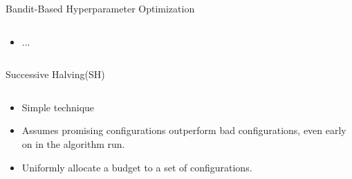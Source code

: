 \begin{frame}{Bandit-Based Hyperparameter Optimization}
\begin{columns}
\begin{column}{.45\linewidth}
\begin{itemize}
\begin{itemize}
	    \item ...
	\end{itemize}
\end{itemize}
\end{column}

\begin{column}{.45\textwidth}

\end{column}

\end{columns}

\end{frame}


\begin{frame}{Successive Halving(SH)}
\begin{columns}

\begin{column}{.45\textwidth}
\vspace{-1em}
\begin{itemize}
    \item Simple technique
    \item Assumes promising configurations outperform bad configurations, even early on in the algorithm run.
    \pause
    \item Uniformly allocate a budget to a set of configurations.
    \pause
\end{itemize}
\end{column}


\end{columns}
\end{frame}
